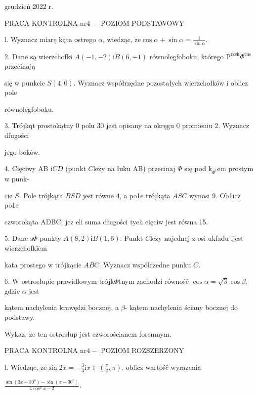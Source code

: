 \documentclass[a4paper,12pt]{article}
\begin{document}
grudzień 2022 r.

PRACA KONTROLNA $\mathrm{n}\mathrm{r} 4-$ POZIOM PODSTAWOWY

l. Wyznacz miarę kąta ostrego $\alpha$, wiedząc, $\dot{\mathrm{z}}\mathrm{e} \displaystyle \cos\alpha+\sin\alpha=\frac{1}{\sin\alpha}.$

2. Dane są wierzchofki $A(-1,-2)\mathrm{i}B(6,-1)$ równolegfoboku, którego $\mathrm{P}^{\mathrm{r}\mathrm{z}\mathrm{e}\mathrm{k}}\Phi^{\mathrm{t}\mathrm{n}\mathrm{e}}$ przecinają

się $\mathrm{w}$ punkcie $S(4,0)$. Wyznacz współrzędne pozostałych wierzchołków $\mathrm{i}$ oblicz pole

równolegfoboku.

3. Trójkqt prostokątny $0$ polu 30 jest opisany na okręgu $0$ promieniu 2. Wyznacz dfugości

jego boków.

4. Cięciwy AB $\mathrm{i}CD$ (punkt $C\mathrm{l}\mathrm{e}\dot{\mathrm{z}}\mathrm{y}$ na łuku AB) przecinaj $\Phi$ się pod $\mathrm{k}_{\Phi^{\mathrm{t}}}\mathrm{e}\mathrm{m}$ prostym $\mathrm{w}$ punk-

cie $S$. Pole trójkąta $BSD$ jest równe 4, a po1e trójkąta $ASC$ wynosi 9. Ob1icz po1e

czworokąta ADBC, $\mathrm{j}\mathrm{e}\dot{\mathrm{z}}$ eli suma długości tych cięciw jest równa 15.

5. Dane $\mathrm{s}\Phi$ punkty $A(8,2)\mathrm{i}B(1,6)$. Punkt $C\mathrm{l}\mathrm{e}\dot{\mathrm{z}}\mathrm{y}$ najednej $\mathrm{z}$ osi ukfadu ijest wierzchofkiem

kata prostego $\mathrm{w}$ trójkącie $ABC$. Wyznacz współrzedne punku $C.$

6. $\mathrm{W}$ ostrosłupie prawidlowym trójk$\Phi$tnym zachodzi równośč $\cos\alpha=\sqrt{3}\cos\beta$, gdzie $\alpha$ jest

kątem nachylenia krawędzi bocznej, a $\beta$- kątem nachylenia ściany bocznej do podstawy.

Wykaz, $\dot{\mathrm{z}}\mathrm{e}$ ten ostrosłup jest czworościanem foremnym.




PRACA KONTROLNA $\mathrm{n}\mathrm{r} 4-$ POZIOM ROZSZERZONY

l. Wiedzqc, $\displaystyle \dot{\mathrm{z}}\mathrm{e}\sin 2x=-\frac{3}{4} \mathrm{i}  x\in (\displaystyle \frac{\pi}{2},\pi)$, oblicz wartośč wyrazenia

$\displaystyle \frac{\sin(3x+30^{\mathrm{o}})-\sin(x-30^{\mathrm{o}})}{4\cos^{2}x-2}.$
\end{document}
